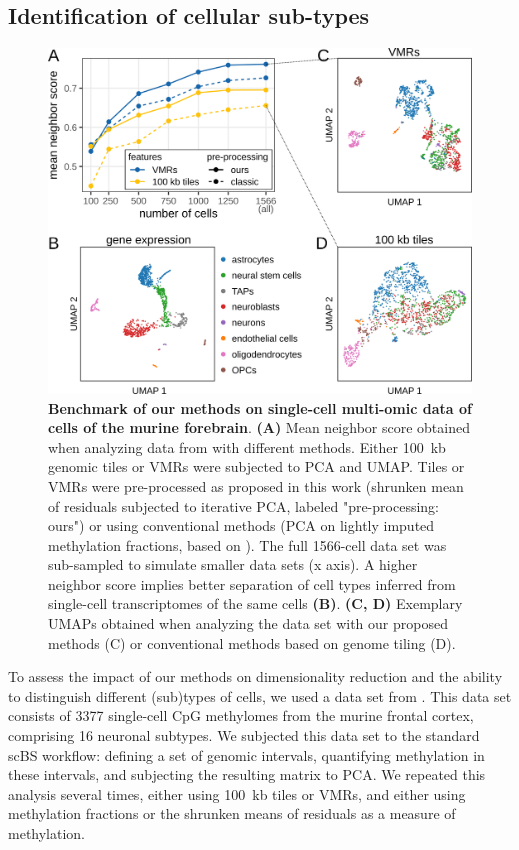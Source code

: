 \documentclass[twocolumn,10pt]{article}
\begin{document}
\subsection{Identification of cellular sub-types}

\begin{figure}
    \begin{center}
        \includegraphics[width=\columnwidth]{figures/Fig_benchmark.png}
    \end{center}
    \caption{\small \textbf{Benchmark of our methods on single-cell multi-omic data of cells of the murine forebrain}.
    \textbf{(A)} Mean neighbor score obtained when analyzing data from \citet{kremer_scnmt} with different methods.
    Either 100~kb genomic tiles or VMRs were subjected to PCA and UMAP.
    Tiles or VMRs were pre-processed as proposed in this work (shrunken mean of residuals subjected to iterative PCA, labeled "pre-processing: ours") or using conventional methods (PCA on lightly imputed methylation fractions, based on \citep{luo2017single}).
    The full 1566-cell data set was sub-sampled to simulate smaller data sets (x axis).
    A higher neighbor score implies better separation of cell types inferred from single-cell transcriptomes of the same cells \textbf{(B)}.
    \textbf{(C, D)} Exemplary UMAPs obtained when analyzing the data set with our proposed methods (C) or conventional methods based on genome tiling (D).}
    \label{fig:score}
\end{figure}

To assess the impact of our methods on dimensionality reduction and the ability to distinguish different (sub)types of cells, we used a data set from \citet{luo2017single}.
This data set consists of 3377 single-cell CpG methylomes from the murine frontal cortex, comprising 16 neuronal subtypes.
We subjected this data set to the standard scBS workflow: defining a set of genomic intervals, quantifying methylation in these intervals, and subjecting the resulting matrix to PCA.
We repeated this analysis several times, either using 100~kb tiles or VMRs, and either using methylation fractions or the shrunken means of residuals as a measure of methylation.
\end{document}
